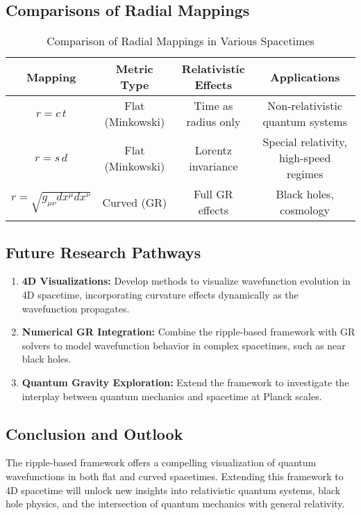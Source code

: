 \documentclass{article}
\begin{document}
\subsection{Comparisons of Radial Mappings}
\begin{table}[H]
\centering
\caption{Comparison of Radial Mappings in Various Spacetimes}
\label{tab:metric_comparison}
\begin{tabular}{|c|c|c|c|}
\hline
\textbf{Mapping} & \textbf{Metric Type} & \textbf{Relativistic Effects} & \textbf{Applications} \\
\hline
\(r = c\,t\) & Flat (Minkowski) & Time as radius only & Non-relativistic quantum systems \\
\hline
\(r = s\,d\) & Flat (Minkowski) & Lorentz invariance & Special relativity, high-speed regimes \\
\hline
\(r = \sqrt{g_{\mu\nu} dx^\mu dx^\nu}\) & Curved (GR) & Full GR effects & Black holes, cosmology \\
\hline
\end{tabular}
\end{table}

\subsection{Future Research Pathways}
\begin{enumerate}
    \item \textbf{4D Visualizations:}
    Develop methods to visualize wavefunction evolution in 4D spacetime, incorporating curvature effects dynamically as the wavefunction propagates.

    \item \textbf{Numerical GR Integration:}
    Combine the ripple-based framework with GR solvers to model wavefunction behavior in complex spacetimes, such as near black holes.

    \item \textbf{Quantum Gravity Exploration:}
    Extend the framework to investigate the interplay between quantum mechanics and spacetime at Planck scales.
\end{enumerate}

\subsection{Conclusion and Outlook}
The ripple-based framework offers a compelling visualization of quantum wavefunctions in both flat and curved spacetimes. Extending this framework to 4D spacetime will unlock new insights into relativistic quantum systems, black hole physics, and the intersection of quantum mechanics with general relativity.



\newpage



\end{document}
